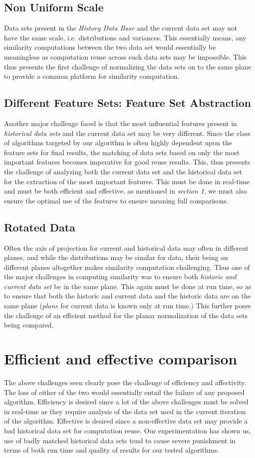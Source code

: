 \subsection{Non Uniform Scale}
Data sets present in the \textit{History Data Base} and the current data set may not have the same scale, i.e. distributions and variances. This essentially means, any similarity computations between the two data set would essentially be meaningless as computation reuse across such data sets may be impossible. This thus presents the first challenge of normalizing the data sets on to the same plane to provide a common platform for similarity computation.
\subsection{Different Feature Sets: Feature Set Abstraction}
Another major challenge faced is that the most influential features present in \textit{historical data sets} and the current data set may be very different. Since the class of algorithms targeted by our algorithm is often highly dependent upon the feature sets for final results, the matching of data sets based on only the most important features becomes imperative for good reuse results. This, thus presents the challenge of analyzing both the current data set and the historical data set for the extraction of the most important features. This must be done in real-time and must be both efficient and effective. as mentioned in \textit{section 1}, we must also ensure the optimal use of the features to ensure meaning full comparisons.
\subsection{Rotated Data}
Often the axis of projection for current and historical data may often in different planes, and while the distributions may be similar for data, their being on different planes altogether makes similarity computation challenging. Thus one of the major challenges in computing similarity was to ensure both \textit{historic and current data set} be in the same plane. This again must be done at run time, so as to ensure that both the historic and current data and the historic data are on the same plane (\textit{plane} for current data is known only at run time.) This further poses the challenge of an efficient method for the planar normalization of the data sets being compared.
\section{Efficient and effective comparison}
The above challenges seen clearly pose the challenge of efficiency and affectivity. The loss of either of the two would essentially entail the failure of any proposed algorithm.
Efficiency is desired since a lot of the above challenges must be solved in real-time as they require analysis of the data set used in the current iteration of the algorithm.
Effective is desired since a non-effective data set may provide a bad historical data set for computation reuse. Our experimentation has shown us, use of badly matched historical data sets tend to cause severe punishment in terms of both run time and quality of results for our tested algorithms.
